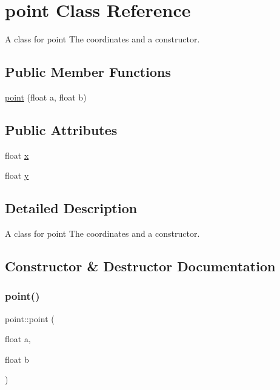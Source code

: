 \hypertarget{classpoint}{}\section{point Class Reference}
\label{classpoint}


A class for point  The coordinates and a constructor.  


\subsection*{Public Member Functions}
\begin{DoxyCompactItemize}
\item 
\hyperlink{classpoint_a126b72c139d88abce764b54c967acfb8}{point} (float a, float b)
\end{DoxyCompactItemize}
\subsection*{Public Attributes}
\begin{DoxyCompactItemize}
\item 
float \hyperlink{classpoint_a8293fd2de3ce739deb6d53691fd21fcf}{x}
\item 
float \hyperlink{classpoint_a616ad85a2096d1566f5971666bbc3b3f}{y}
\end{DoxyCompactItemize}


\subsection{Detailed Description}
A class for point  The coordinates and a constructor. 

\subsection{Constructor \& Destructor Documentation}
\mbox{\label{classpoint_a126b72c139d88abce764b54c967acfb8}} 
\subsubsection{\texorpdfstring{point()}{point()}}
{\footnotesize\ttfamily point\+::point (\begin{DoxyParamCaption}\item[{float}]{a,  }\item[{float}]{b }\end{DoxyParamCaption})\hspace{0.3cm}{\ttfamily [inline]}}

